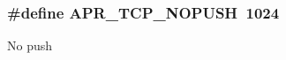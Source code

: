 \subsubsection[{\texorpdfstring{A\+P\+R\+\_\+\+T\+C\+P\+\_\+\+N\+O\+P\+U\+SH}{APR_TCP_NOPUSH}}]{\setlength{\rightskip}{0pt plus 5cm}\#define A\+P\+R\+\_\+\+T\+C\+P\+\_\+\+N\+O\+P\+U\+SH~1024}\hypertarget{group__apr__sockopt_ga7679a9e3114815eb6c31d26db707975d}{}\label{group__apr__sockopt_ga7679a9e3114815eb6c31d26db707975d}
No push 